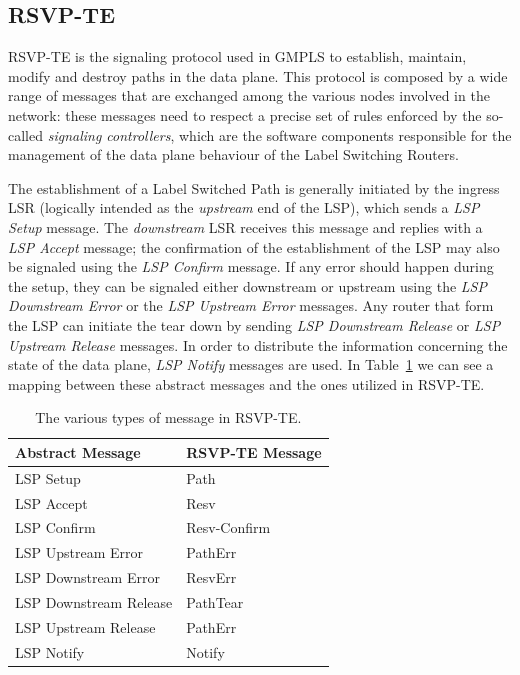 \documentclass[10pt,a4paper]{report}
\begin{document}
\subsection{RSVP-TE}

RSVP-TE is the signaling protocol used in GMPLS to establish,
maintain, modify and destroy paths in the data plane. This protocol is
composed by a wide range of messages that are exchanged among the
various nodes involved in the network: these messages need to respect
a precise set of rules enforced by the so-called \textit{signaling
  controllers}, which are the software components responsible for the
management of the data plane behaviour of the Label Switching Routers.

The establishment of a Label Switched Path is generally initiated by
the ingress LSR (logically intended as the \textit{upstream} end of
the LSP), which sends a \textit{LSP Setup} message. The
\textit{downstream} LSR receives this message and replies with a
\textit{LSP Accept} message; the confirmation of the establishment of
the LSP may also be signaled using the \textit{LSP Confirm}
message. If any error should happen during the setup, they can be
signaled either downstream or upstream using the \textit{LSP
  Downstream Error} or the \textit{LSP Upstream Error} messages. Any
router that form the LSP can initiate the tear down by sending
\textit{LSP Downstream Release} or \textit{LSP Upstream Release}
messages. In order to distribute the information concerning the state
of the data plane, \textit{LSP Notify} messages are used. In
Table~\ref{tab:rsvp_messages} we can see a mapping between these
abstract messages and the ones utilized in RSVP-TE.

\begin{table}[!htbp]
  \begin{center}
    \begin{tabular}{|l|l|}
      \hline
      Abstract Message &  RSVP-TE Message \\ \hline
      LSP Setup & Path \\
      LSP Accept & Resv \\
      LSP Confirm & Resv-Confirm \\
      LSP Upstream Error & PathErr \\
      LSP Downstream Error & ResvErr \\
      LSP Downstream Release & PathTear \\
      LSP Upstream Release & PathErr \\
      LSP Notify & Notify \\
      \hline
    \end{tabular}
    \caption[RSVP-TE messages]{The various types of message in
      RSVP-TE.}
    \label{tab:rsvp_messages}
  \end{center}
\end{table}
\end{document}
